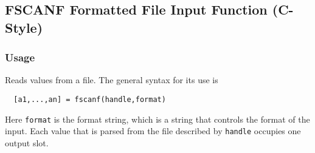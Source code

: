 %
%
%
\subsection{FSCANF Formatted File Input Function (C-Style)}
\subsubsection{Usage}
Reads values from a file.  The general syntax for its use is
\begin{verbatim}
  [a1,...,an] = fscanf(handle,format)
\end{verbatim}
Here \verb|format| is the format string, which is a string that
controls the format of the input.  Each value that is parsed from
the file described by \verb|handle| occupies one output slot.
